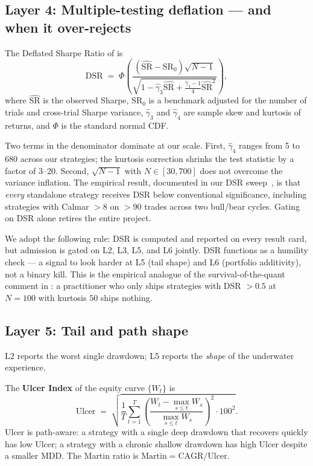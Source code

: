 \documentclass[11pt]{article}
\begin{document}
\subsection{Layer 4: Multiple-testing deflation --- and when it over-rejects}
\label{sec:l4}
The Deflated Sharpe Ratio of \citet{lopezdeprado2014dsr} is
\begin{equation}
\mathrm{DSR} \;=\; \Phi\!\left(
  \frac{(\widehat{\mathrm{SR}} - \mathrm{SR}_0)\sqrt{N-1}}
       {\sqrt{1 - \hat{\gamma}_3 \widehat{\mathrm{SR}} + \frac{\hat{\gamma}_4 - 1}{4}\widehat{\mathrm{SR}}^2}}
\right),
\label{eq:dsr}
\end{equation}
where $\widehat{\mathrm{SR}}$ is the observed Sharpe, $\mathrm{SR}_0$ is a
benchmark adjusted for the number of trials and cross-trial Sharpe variance,
$\hat{\gamma}_3$ and $\hat{\gamma}_4$ are sample skew and kurtosis of
returns, and $\Phi$ is the standard normal CDF.

Two terms in the denominator dominate at our scale. First, $\hat{\gamma}_4$
ranges from 5 to 680 across our strategies; the kurtosis correction shrinks
the test statistic by a factor of 3--20. Second, $\sqrt{N-1}$ with
$N \in [30, 700]$ does not overcome the variance inflation. The empirical
result, documented in our DSR sweep~\citep{result_dsr_analysis}, is that
\emph{every} standalone strategy receives DSR below conventional
significance, including strategies with Calmar $> 8$ on $> 90$ trades across
two bull/bear cycles. Gating on DSR alone retires the entire project.

We adopt the following rule: DSR is computed and reported on every result
card, but admission is gated on L2, L3, L5, and L6 jointly. DSR functions as
a humility check --- a signal to look harder at L5 (tail shape) and L6
(portfolio additivity), not a binary kill. This is the empirical analogue of
the survival-of-the-quant comment in \citet{davies2025survival}: a
practitioner who only ships strategies with DSR $> 0.5$ at $N=100$ with
kurtosis $50$ ships nothing.

\subsection{Layer 5: Tail and path shape}
\label{sec:l5}

L2 reports the worst single drawdown; L5 reports the \emph{shape} of the
underwater experience.

The \textbf{Ulcer Index} of the equity curve $\{W_t\}$ is
\begin{equation}
\mathrm{Ulcer} \;=\; \sqrt{\frac{1}{T} \sum_{t=1}^{T}
\left(\frac{W_t - \max_{s \leq t} W_s}{\max_{s \leq t} W_s}\right)^2 \cdot 100^2}.
\end{equation}
Ulcer is path-aware: a strategy with a single deep drawdown that recovers
quickly has low Ulcer; a strategy with a chronic shallow drawdown has high
Ulcer despite a smaller MDD. The Martin ratio is
$\mathrm{Martin} = \mathrm{CAGR} / \mathrm{Ulcer}$.
\end{document}
